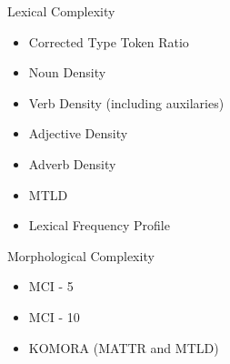 Lexical Complexity
\begin{itemize}
    \item Corrected Type Token Ratio
    \item Noun Density
    \item Verb Density (including auxilaries)
    \item Adjective Density
    \item Adverb Density
    \item MTLD
    \item Lexical Frequency Profile
\end{itemize}

Morphological Complexity
\begin{itemize}
    \item MCI - 5
    \item MCI - 10
    \item KOMORA (MATTR and MTLD)
\end{itemize}

